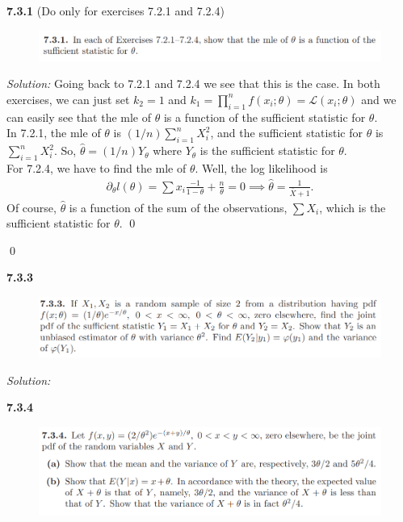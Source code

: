 \documentclass{book}
\theoremstyle{definition}
\newcommand{\p}{\partial}
\newcommand{\lag}{\mathcal{L}}
\newcommand{\f}[2]{\frac{#1}{#2}}
\begin{document}
\newpage



\noindent\textbf{7.3.1} (Do only for exercises 7.2.1 and 7.2.4)
\begin{figure}[!htb]
	\centering
	\includegraphics[scale=1]{731}
\end{figure}




\noindent \textit{Solution:} Going back to 7.2.1 and 7.2.4 we see that this is the case. In both exercises, we can just set $k_2 = 1$ and $k_1 = \prod^n_{i=1}f(x_i;\theta) = \lag(x_i;\theta)$ and we can easily see that the mle of $\theta$ is a function of the sufficient statistic for $\theta$.  \\

In 7.2.1, the mle of $\theta$ is $(1/n)\sum^n_{i=1}X_i^2$, and the sufficient statistic for $\theta$ is $\sum^n_{i=1}X_i^2$. So, $\hat\theta = (1/n)Y_\theta$ where $Y_\theta$ is the sufficient statistic for $\theta$.\\

For 7.2.4, we have to find the mle of $\theta$. Well, the log likelihood is 
\begin{align*}
\p_\theta l(\theta) = \sum x_i\f{-1}{1-\theta} + \f{n}{\theta} = 0 \implies \hat\theta = \f{1}{\bar{X}+1}.
\end{align*} 
Of course, $\hat\theta$ is a function of the sum of the observations, $\sum X_i$, which is the sufficient statistic for $\theta$. \qed



\qed
\newpage



\noindent\textbf{7.3.3}
\begin{figure}[!htb]
	\centering
	\includegraphics[scale=1]{733}
\end{figure}



\noindent \textit{Solution:}
\newpage





\noindent\textbf{7.3.4}
\begin{figure}[!htb]
	\centering
	\includegraphics[scale=1]{734}
\end{figure}
\end{document}
